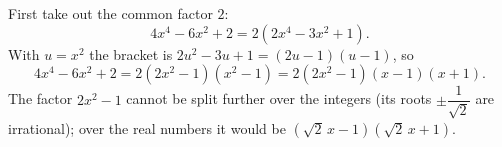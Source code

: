First take out the common factor $2$:
\[4x^4-6x^2+2=2\left(2x^4-3x^2+1\right).\]
With $u=x^2$ the bracket is $2u^2-3u+1=(2u-1)(u-1)$, so
\[4x^4-6x^2+2=2\left(2x^2-1\right)\left(x^2-1\right)=\boxed{2\left(2x^2-1\right)(x-1)(x+1)}.\]
The factor $2x^2-1$ cannot be split further over the integers (its roots $\pm\dfrac{1}{\sqrt2}$ are irrational); over the real numbers it would be $\left(\sqrt2\,x-1\right)\left(\sqrt2\,x+1\right)$.
